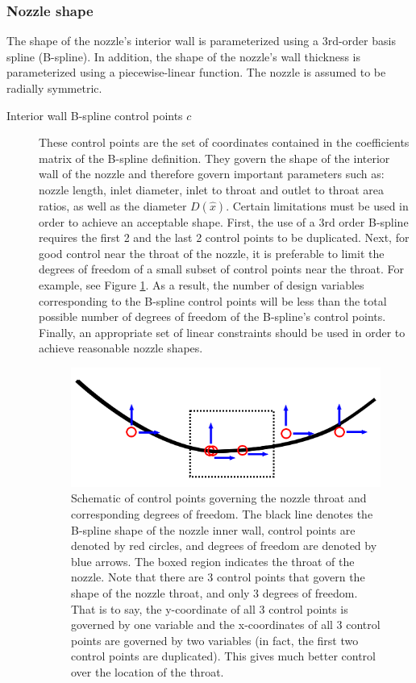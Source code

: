 \documentclass{article}
\begin{document}
\subsubsection{Nozzle shape}
The shape of the nozzle's interior wall is parameterized using a 3rd-order basis spline (B-spline). In addition, the shape of the nozzle's wall thickness is parameterized using a piecewise-linear function. The nozzle is assumed to be radially symmetric.
\begin{description}
\item[Interior wall B-spline control points $c$] These control points are the set of coordinates contained in the coefficients matrix of the B-spline definition. They govern the shape of the interior wall of the nozzle and therefore govern important parameters such as: nozzle length, inlet diameter, inlet to throat and outlet to throat area ratios, as well as the diameter $D(\hat x)$. Certain limitations must be used in order to achieve an acceptable shape. First, the use of a 3rd order B-spline requires the first 2 and the last 2 control points to be duplicated. Next, for good control near the throat of the nozzle, it is preferable to limit the degrees of freedom of a small subset of control points near the throat. For example, see Figure \ref{fig:throatDofs}. As a result, the number of design variables corresponding to the B-spline control points will be less than the total possible number of degrees of freedom of the B-spline's control points. Finally, an appropriate set of linear constraints should be used in order to achieve reasonable nozzle shapes.

\begin{figure}
\caption{Schematic of control points governing the nozzle throat and corresponding degrees of freedom. The black line denotes the B-spline shape of the nozzle inner wall, control points are denoted by red circles, and degrees of freedom are denoted by blue arrows. The boxed region indicates the throat of the nozzle. Note that there are 3 control points that govern the shape of the nozzle throat, and only 3 degrees of freedom. That is to say, the y-coordinate of all 3 control points is governed by one variable and the x-coordinates of all 3 control points are governed by two variables (in fact, the first two control points are duplicated). This gives much better control over the location of the throat.}
\label{fig:throatDofs}
\begin{center}
\includegraphics[scale=0.5]{figs/throat_area_control_points.png}
\end{center}
\end{figure}


\end{description}
\end{document}
